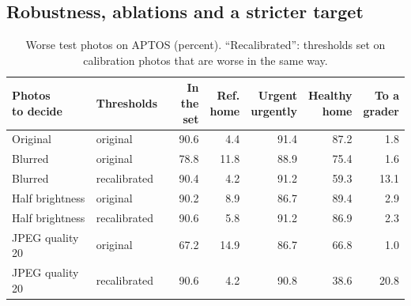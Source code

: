\documentclass[10pt,twocolumn,letterpaper]{article}
\begin{document}
\subsection{Robustness, ablations and a stricter target}
\begin{table}[t]\centering\small
\begin{adjustbox}{max width=\linewidth}\begin{tabular}{@{}llrrrrr@{}}\toprule
\shortstack[l]{Photos\\to decide} & Thresholds & \shortstack{In the\\set} & \shortstack{Ref.\\home} & \shortstack{Urgent\\urgently} & \shortstack{Healthy\\home} & \shortstack{To a\\grader}\\\midrule
Original & original & 90.6 & 4.4 & 91.4 & 87.2 & 1.8\\
Blurred & original & 78.8 & 11.8 & 88.9 & 75.4 & 1.6\\
Blurred & recalibrated & 90.4 & 4.2 & 91.2 & 59.3 & 13.1\\
Half brightness & original & 90.2 & 8.9 & 86.7 & 89.4 & 2.9\\
Half brightness & recalibrated & 90.6 & 5.8 & 91.2 & 86.9 & 2.3\\
JPEG quality 20 & original & 67.2 & 14.9 & 86.7 & 66.8 & 1.0\\
JPEG quality 20 & recalibrated & 90.6 & 4.2 & 90.8 & 38.6 & 20.8\\\bottomrule
\end{tabular}\end{adjustbox}
\caption{Worse test photos on APTOS (percent). ``Recalibrated'': thresholds set on calibration photos that are worse in the same way.}\label{tab:robust}
\end{table}
\end{document}
